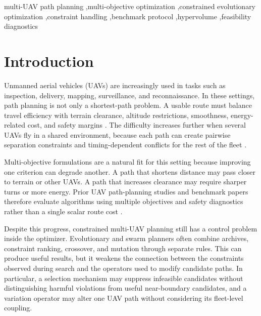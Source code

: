 \documentclass[a4paper,fleqn]{cas-dc}
\begin{document}
\begin{keywords}
multi-UAV path planning \sep multi-objective optimization \sep constrained evolutionary optimization \sep constraint handling \sep benchmark protocol \sep hypervolume \sep feasibility diagnostics
\end{keywords}

\maketitle

\section{Introduction}
\label{sec:introduction}

Unmanned aerial vehicles (UAVs) are increasingly used in tasks such as inspection, delivery, mapping, surveillance, and reconnaissance. In these settings, path planning is not only a shortest-path problem. A usable route must balance travel efficiency with terrain clearance, altitude restrictions, smoothness, energy-related cost, and safety margins \cite{jiang2024ec_uav_survey,besada2013uav_comparison,darlan2025benchmark}. The difficulty increases further when several UAVs fly in a shared environment, because each path can create pairwise separation constraints and timing-dependent conflicts for the rest of the fleet \cite{zhang2024twofold_uav,meng2025emmop}.

Multi-objective formulations are a natural fit for this setting because improving one criterion can degrade another. A path that shortens distance may pass closer to terrain or other UAVs. A path that increases clearance may require sharper turns or more energy. Prior UAV path-planning studies and benchmark papers therefore evaluate algorithms using multiple objectives and safety diagnostics rather than a single scalar route cost \cite{peng2022decomp_uav,darlan2025benchmark,meng2025emmop,zhou2024tskac,duong2025nmopso_uav}.

Despite this progress, constrained multi-UAV planning still has a control problem inside the optimizer. Evolutionary and swarm planners often combine archives, constraint ranking, crossover, and mutation through separate rules. This can produce useful results, but it weakens the connection between the constraints observed during search and the operators used to modify candidate paths. In particular, a selection mechanism may suppress infeasible candidates without distinguishing harmful violations from useful near-boundary candidates, and a variation operator may alter one UAV path without considering its fleet-level coupling.
\end{document}
